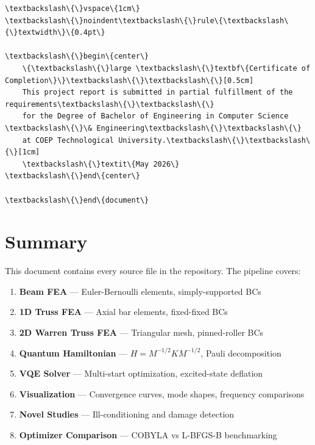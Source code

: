 \documentclass[12pt, a4paper]{article}
\begin{document}
\begin{lstlisting}[style=codestyle, caption={VQA\_Modal\_Analysis\_Report.tex}]
\textbackslash\{\}vspace\{1cm\}
\textbackslash\{\}noindent\textbackslash\{\}rule\{\textbackslash\{\}textwidth\}\{0.4pt\}

\textbackslash\{\}begin\{center\}
    \{\textbackslash\{\}large \textbackslash\{\}textbf\{Certificate of Completion\}\}\textbackslash\{\}\textbackslash\{\}[0.5cm]
    This project report is submitted in partial fulfillment of the requirements\textbackslash\{\}\textbackslash\{\}
    for the Degree of Bachelor of Engineering in Computer Science \textbackslash\{\}\& Engineering\textbackslash\{\}\textbackslash\{\}
    at COEP Technological University.\textbackslash\{\}\textbackslash\{\}[1cm]
    \textbackslash\{\}textit\{May 2026\}
\textbackslash\{\}end\{center\}

\textbackslash\{\}end\{document\}
\end{lstlisting}

\section{Summary}
This document contains every source file in the repository. The pipeline covers:
\begin{enumerate}
\item \textbf{Beam FEA} --- Euler-Bernoulli elements, simply-supported BCs
\item \textbf{1D Truss FEA} --- Axial bar elements, fixed-fixed BCs
\item \textbf{2D Warren Truss FEA} --- Triangular mesh, pinned-roller BCs
\item \textbf{Quantum Hamiltonian} --- $H = M^{-1/2} K M^{-1/2}$, Pauli decomposition
\item \textbf{VQE Solver} --- Multi-start optimization, excited-state deflation
\item \textbf{Visualization} --- Convergence curves, mode shapes, frequency comparisons
\item \textbf{Novel Studies} --- Ill-conditioning and damage detection
\item \textbf{Optimizer Comparison} --- COBYLA vs L-BFGS-B benchmarking
\end{enumerate}
\end{document}
